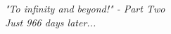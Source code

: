 \thispagestyle{empty}

\begin{center}

\mbox{}


\begin{flushright}
\textit{"To infinity and beyond!" - Part Two\\ Just 966 days later...}
\end{flushright}

\newpage

\end{center}
